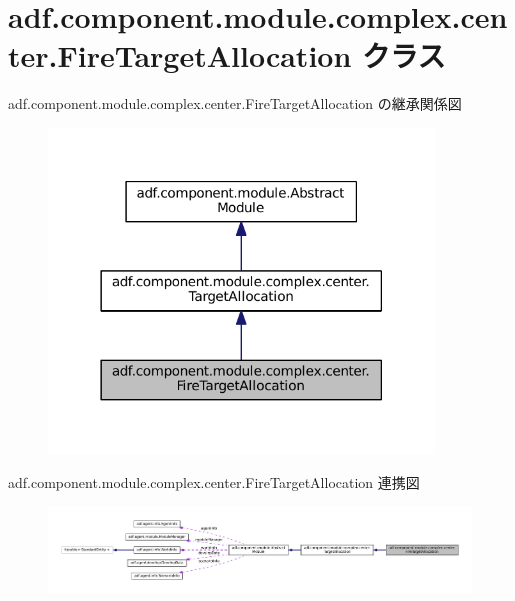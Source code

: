 \hypertarget{classadf_1_1component_1_1module_1_1complex_1_1center_1_1FireTargetAllocation}{}\section{adf.\+component.\+module.\+complex.\+center.\+Fire\+Target\+Allocation クラス}
\label{classadf_1_1component_1_1module_1_1complex_1_1center_1_1FireTargetAllocation}


adf.\+component.\+module.\+complex.\+center.\+Fire\+Target\+Allocation の継承関係図
\nopagebreak
\begin{figure}[H]
\begin{center}
\leavevmode
\includegraphics[width=290pt]{classadf_1_1component_1_1module_1_1complex_1_1center_1_1FireTargetAllocation__inherit__graph}
\end{center}
\end{figure}


adf.\+component.\+module.\+complex.\+center.\+Fire\+Target\+Allocation 連携図
\nopagebreak
\begin{figure}[H]
\begin{center}
\leavevmode
\includegraphics[width=350pt]{classadf_1_1component_1_1module_1_1complex_1_1center_1_1FireTargetAllocation__coll__graph}
\end{center}
\end{figure}
